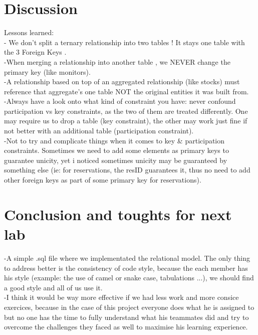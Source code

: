 \documentclass[a4paper,12pt]{article}
\begin{document}
\section{Discussion}
Lessons learned:\\
- We don't split a ternary relationship into two tables ! It stays one table with the 3 Foreign Keys .\\
-When merging a relationship into another table , we NEVER change the primary key (like monitors).\\
-A relationship based on top of an aggregated relationship (like stocks) must reference that aggregate's one table NOT the original entities it was built from.\\
-Always have a look onto what kind of constraint you have: never confound participation vs key constraints, as the two of them are treated differently. One may require us to drop a table (key constraint), the other may work just fine if not better with an additional table (participation constraint).\\
-Not to try and complicate things when it comes to key & participation constraints. Sometimes we need to add some elements as primary keys to guarantee unicity, yet i noticed sometimes unicity may be guaranteed by something else (ie: for reservations, the resID guarantees it, thus no need to add other foreign keys as part of some primary key for reservations).\\

\section{Conclusion and toughts for next lab}
-A simple .sql file where we implementated the relational model. The only thing to address better is the consistency of code style, because the each member has his style (example: the use of camel or snake case, tabulations ...), we should find a good style and all of us use it.\\
-I think it would be way more effective if we had less work and more consice exercices, because in the case of this  project everyone does what he is assigned to but no one has the time to fully understand what his teammates did and try to overcome the challenges they faced as well to maximise his learning experience.\\
\end{document}
